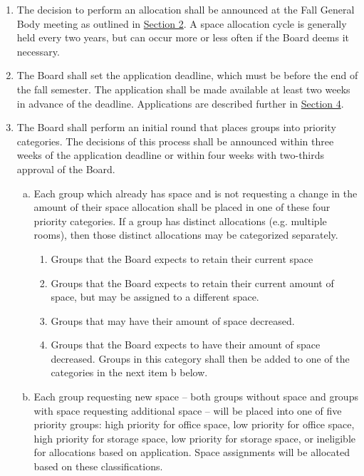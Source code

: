 \documentclass[12pt]{article}
\begin{document}
\begin{enumerate}
    \item The decision to perform an allocation shall be announced at the Fall General Body meeting
as outlined in \hyperref[art:VII_sect2]{Section 2}. A space allocation cycle is generally held every two years, but can
occur more or less often if the Board deems it necessary.
    \item The Board shall set the application deadline, which must be before the end of the fall
semester. The application shall be made available at least two weeks in advance of the
deadline. Applications are described further in \hyperref[art:VII_sect4]{Section 4}.
    \item The Board shall perform an initial round that places groups into priority categories. The
decisions of this process shall be announced within three weeks of the application deadline or
within four weeks with two-thirds approval of the Board.
    \begin{enumerate}[a.]
\item Each group which already has space and is not requesting a change in the amount
of their space allocation shall be placed in one of these four priority categories. If a
group has distinct allocations (e.g. multiple rooms), then those distinct allocations
may be categorized separately.
        \begin{enumerate}[noitemsep, label=\roman*.]
            \item Groups that the Board expects to retain their current space
            \item Groups that the Board expects to retain their current amount of space, but
may be assigned to a different space.
            \item Groups that may have their amount of space decreased.
            \item Groups that the Board expects to have their amount of space decreased.
Groups in this category shall then be added to one of the categories in the
next item b below.
        \end{enumerate}

        \item Each group requesting new space – both groups without space and groups with
space requesting additional space – will be placed into one of five priority groups:
high priority for office space, low priority for office space, high priority for storage
space, low priority for storage space, or ineligible for allocations based on
application. Space assignments will be allocated based on these classifications.
    \end{enumerate}


\end{enumerate}
\end{document}
